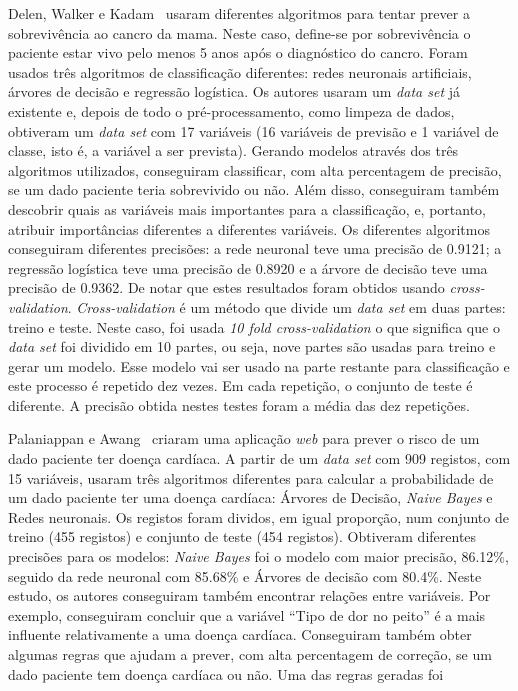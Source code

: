 Delen, Walker e Kadam~\cite{cancer} usaram diferentes algoritmos para tentar prever a sobrevivência ao cancro da mama. Neste caso, define-se por sobrevivência o paciente estar vivo pelo menos 5 anos após o diagnóstico do cancro. Foram usados três algoritmos de classificação diferentes: redes neuronais artificiais, árvores de decisão e regressão logística. Os autores usaram um \textit{data set} já existente e, depois de todo o pré-processamento, como limpeza de dados, obtiveram um \textit{data set} com 17 variáveis (16 variáveis de previsão e 1 variável de classe, isto é, a variável a ser prevista). Gerando modelos através dos três algoritmos utilizados, conseguiram classificar, com alta percentagem de precisão, se um dado paciente teria sobrevivido ou não. Além disso, conseguiram também descobrir quais as variáveis mais importantes para a classificação, e, portanto, atribuir importâncias diferentes a diferentes variáveis. Os diferentes algoritmos conseguiram diferentes precisões: a rede neuronal teve uma precisão de 0.9121; a regressão logística teve uma precisão de 0.8920 e a árvore de decisão teve uma precisão de 0.9362. De notar que estes resultados foram obtidos usando \textit{cross-validation}. \textit{Cross-validation} é um método que divide um \textit{data set} em duas partes: treino e teste. Neste caso, foi usada \textit{10 fold cross-validation} o que significa que o \textit{data set} foi dividido em 10 partes, ou seja, nove partes são usadas para treino e gerar um modelo. Esse modelo vai ser usado na parte restante para classificação e este processo é repetido dez vezes. Em cada repetição, o conjunto de teste é diferente. A precisão obtida nestes testes foram a média das dez repetições.

Palaniappan e Awang~\cite{sota2} criaram uma aplicação \textit{web} para prever o risco de um dado paciente ter doença cardíaca. A partir de um \textit{data set} com 909 registos, com 15 variáveis, usaram três algoritmos diferentes para calcular a probabilidade de um dado paciente ter uma doença cardíaca: Árvores de Decisão, \textit{Naive Bayes} e Redes neuronais. Os registos foram dividos, em igual proporção, num conjunto de treino (455 registos) e conjunto de teste (454 registos). Obtiveram diferentes precisões para os modelos: \textit{Naive Bayes} foi o modelo com maior precisão, 86.12\%, seguido da rede neuronal com 85.68\% e Árvores de decisão com 80.4\%. Neste estudo, os autores conseguiram também encontrar relações entre variáveis. Por exemplo, conseguiram concluir que a variável ``Tipo de dor no peito'' é a mais influente relativamente a uma doença cardíaca. Conseguiram também obter algumas regras que ajudam a prever, com alta percentagem de correção, se um dado paciente tem doença cardíaca ou não. Uma das regras geradas foi 

